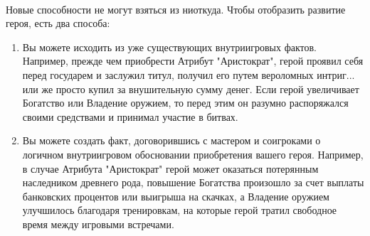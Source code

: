 \paragraph{} Новые способности не могут взяться из ниоткуда. Чтобы отобразить развитие героя, есть два способа:
\begin{enumerate}
    \item Вы можете исходить из уже существующих внутриигровых фактов. Например, прежде чем приобрести Атрибут "Аристократ", герой проявил себя перед государем и заслужил титул, получил его путем вероломных интриг... или же просто купил за внушительную сумму денег. Если герой увеличивает Богатство или Владение оружием, то перед этим он разумно распоряжался своими средствами и принимал участие в битвах.
    \item Вы можете создать факт, договорившись с мастером и соигроками о логичном внутриигровом обосновании приобретения вашего героя. Например, в случае Атрибута "Аристократ" герой может оказаться потерянным наследником древнего рода, повышение Богатства произошло за счет выплаты банковских процентов или выигрыша на скачках, а Владение оружием улучшилось благодаря тренировкам, на которые герой тратил свободное время между игровыми встречами.
\end{enumerate}